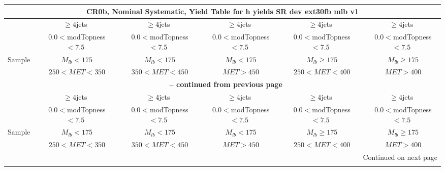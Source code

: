\documentclass{article}
\begin{document}
 
 
 
 
\pagebreak 

 
 
 
 
\begin{longtable}{|l|c|c|c|c|c|} 
 
\multicolumn{6}{c}{ CR0b, Nominal Systematic, Yield Table for h yields SR dev ext30fb mlb v1 }\\* \hline 
  & $\ge4$jets  & $\ge4$jets  & $\ge4$jets  & $\ge4$jets  & $\ge4$jets \\* 
  & ~$0.0<$modTopness$<7.5$  & ~$0.0<$modTopness$<7.5$  & ~$0.0<$modTopness$<7.5$  & ~$0.0<$modTopness$<7.5$  & ~$0.0<$modTopness$<7.5$ \\* 
Sample  & ~$M_{lb}<175$  & ~$M_{lb}<175$  & ~$M_{lb}<175$  & ~$M_{lb}\ge175$  & ~$M_{lb}\ge175$ \\* 
  & ~$250<MET<350$  & ~$350<MET<450$  & ~$MET>450$  & ~$250<MET<400$  & ~$MET>400$ \\* 
\hline \hline 
\endfirsthead 
 
\multicolumn{6}{c}{{\bfseries \tablename\ \thetable{} -- continued from previous page}}\\* \hline 
  & $\ge4$jets  & $\ge4$jets  & $\ge4$jets  & $\ge4$jets  & $\ge4$jets \\* 
  & ~$0.0<$modTopness$<7.5$  & ~$0.0<$modTopness$<7.5$  & ~$0.0<$modTopness$<7.5$  & ~$0.0<$modTopness$<7.5$  & ~$0.0<$modTopness$<7.5$ \\* 
Sample  & ~$M_{lb}<175$  & ~$M_{lb}<175$  & ~$M_{lb}<175$  & ~$M_{lb}\ge175$  & ~$M_{lb}\ge175$ \\* 
  & ~$250<MET<350$  & ~$350<MET<450$  & ~$MET>450$  & ~$250<MET<400$  & ~$MET>400$ \\* 
\hline \hline 
\endhead 
 
\multicolumn{6}{|r|}{{Continued on next page}}\\* \hline 
\endfoot 
 
 
\endlastfoot 
 

\end{longtable}
\end{document}
